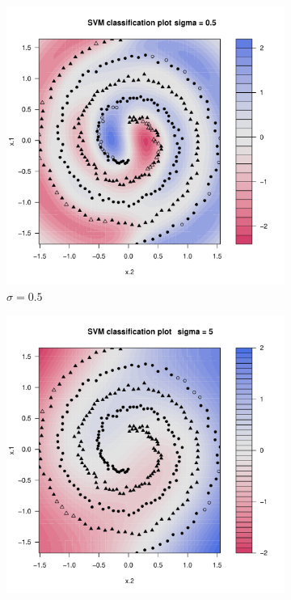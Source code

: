 \begin{figure}[H]
	\centering
	\begin{subfigure}{0.24\linewidth}
		\includegraphics[width=1\linewidth]{Graphics/Problema_01/Experiment_04_1.pdf}
		\caption{$\sigma=0.5$}
	\end{subfigure}
	\begin{subfigure}{0.24\linewidth}
		\includegraphics[width=1\linewidth]{Graphics/Problema_01/Experiment_04_2.pdf}

\end{subfigure}
\end{figure}
